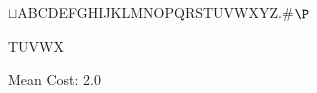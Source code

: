 \documentclass[12pt]{article}
\begin{document}
\begin{tt}
\begin{small}
\begin{bundle}{}
{\begin{bundle}{$\sqcup$ABCDEFGHIJKLMNOPQRSTUVWXYZ.\#$\P$}
{\begin{bundle}{TUVWX}
\end{bundle}}
\end{bundle}}

\end{bundle}
\end{small}
\end{tt}
\newpage\newpage
\noindent
\noindent Mean Cost: 2.0\\
\end{document}
